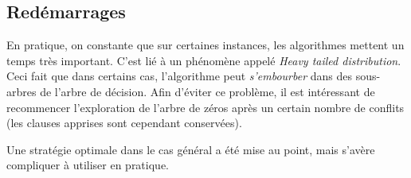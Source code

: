 
\subsection{Redémarrages}\label{restart}
En pratique, on constante que sur certaines instances, les algorithmes mettent
un temps très important. C'est lié à un phénomène appelé \emph{Heavy tailed
distribution}. 
Ceci fait que dans certains cas, l'algorithme peut \emph{s'embourber} dans des
sous-arbres de l'arbre de décision. Afin d'éviter ce problème, il est
intéressant de recommencer l'exploration de l'arbre de zéros après un certain
nombre de conflits (les clauses apprises sont cependant conservées).

Une stratégie optimale dans le cas général a été mise au point, 
mais s'avère compliquer à utiliser en pratique.

